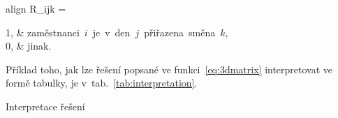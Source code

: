 \documentclass[twoside]{ctuthesis}
\newcommand{\coloredeq}[2]{\begin{empheq}[box=\colorbox{Gray}]{align}\label{#1}\hspace{1em}#2\hspace{1em}\end{empheq}}
\begin{document}
\coloredeq{eq:3dmatrix}{
	R_{ijk} =
	\begin{cases}
		1, & \mbox{zaměstnanci $i$ je v den $j$ přiřazena směna $k$,} \\
		0, & \mbox{jinak.}\\
	\end{cases}
}


Příklad toho, jak lze řešení popsané ve funkci~\ref{eq:3dmatrix} interpretovat ve formě tabulky, je v~tab.~\ref{tab:interpretation}.
\begin{table}[h]
	
	\caption{Interpretace řešení}
	\label{tab:interpretation}
\end{table}


%
%
%
%
% 	
%
\end{document}
